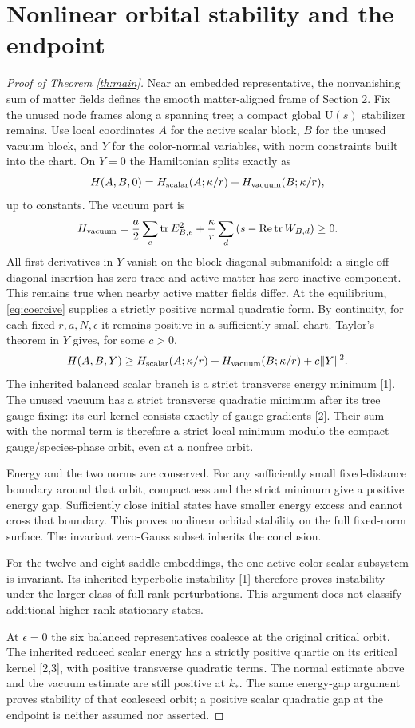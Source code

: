 \documentclass[11pt,a4paper]{article}
\newcommand{\tr}{\operatorname{tr}}\newcommand{\diag}{\operatorname{diag}}\newcommand{\Rea}{\operatorname{Re}}\newcommand{\id}{\mathbf1}
\begin{document}
\section{Nonlinear orbital stability and the endpoint}
\begin{proof}[Proof of Theorem \ref{th:main}]
Near an embedded representative, the nonvanishing sum of matter fields defines the smooth matter-aligned frame of Section 2. Fix the unused node frames along a spanning tree; a compact global $\mathrm U(s)$ stabilizer remains. Use local coordinates $A$ for the active scalar block, $B$ for the unused vacuum block, and $Y$ for the color-normal variables, with norm constraints built into the chart. On $Y=0$ the Hamiltonian splits exactly as
\[
H(A,B,0)=H_{\rm scalar}(A;\kappa/r)+H_{\rm vacuum}(B;\kappa/r),
\]
up to constants. The vacuum part is
\[
H_{\rm vacuum}=\frac a2\sum_e\tr E_{B,e}^2+
\frac\kappa r\sum_d\left(s-\Rea\tr W_{B,d}\right)\ge0.
\]
All first derivatives in $Y$ vanish on the block-diagonal submanifold: a single off-diagonal insertion has zero trace and active matter has zero inactive component. This remains true when nearby active matter fields differ. At the equilibrium, \eqref{eq:coercive} supplies a strictly positive normal quadratic form. By continuity, for each fixed $r,a,N,\epsilon$ it remains positive in a sufficiently small chart. Taylor's theorem in $Y$ gives, for some $c>0$,
\[
H(A,B,Y)\ge H_{\rm scalar}(A;\kappa/r)+H_{\rm vacuum}(B;\kappa/r)
+c\|Y\|^2.
\]
The inherited balanced scalar branch is a strict transverse energy minimum [1]. The unused vacuum has a strict transverse quadratic minimum after its tree gauge fixing: its curl kernel consists exactly of gauge gradients [2]. Their sum with the normal term is therefore a strict local minimum modulo the compact gauge/species-phase orbit, even at a nonfree orbit.

Energy and the two norms are conserved. For any sufficiently small fixed-distance boundary around that orbit, compactness and the strict minimum give a positive energy gap. Sufficiently close initial states have smaller energy excess and cannot cross that boundary. This proves nonlinear orbital stability on the full fixed-norm surface. The invariant zero-Gauss subset inherits the conclusion.

For the twelve and eight saddle embeddings, the one-active-color scalar subsystem is invariant. Its inherited hyperbolic instability [1] therefore proves instability under the larger class of full-rank perturbations. This argument does not classify additional higher-rank stationary states.

At $\epsilon=0$ the six balanced representatives coalesce at the original critical orbit. The inherited reduced scalar energy has a strictly positive quartic on its critical kernel [2,3], with positive transverse quadratic terms. The normal estimate above and the vacuum estimate are still positive at $k_*$. The same energy-gap argument proves stability of that coalesced orbit; a positive scalar quadratic gap at the endpoint is neither assumed nor asserted.
\end{proof}
\end{document}
